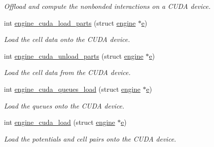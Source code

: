 \begin{DoxyCompactItemize}
\begin{DoxyCompactList}\small\item\em Offload and compute the nonbonded interactions on a C\-U\-D\-A device. \end{DoxyCompactList}\item 
int \hyperlink{runner__cuda_8cu_ab0d9b84f18b2171f13e7b563f3f023f9}{engine\-\_\-cuda\-\_\-load\-\_\-parts} (struct \hyperlink{structengine}{engine} $\ast$\hyperlink{potential__eval_8h_ad93203f13cbfb07bd361e3b37b092fff}{e})
\begin{DoxyCompactList}\small\item\em Load the cell data onto the C\-U\-D\-A device. \end{DoxyCompactList}\item 
int \hyperlink{runner__cuda_8cu_a24fe668d11a9f02087983cacebacc005}{engine\-\_\-cuda\-\_\-unload\-\_\-parts} (struct \hyperlink{structengine}{engine} $\ast$\hyperlink{potential__eval_8h_ad93203f13cbfb07bd361e3b37b092fff}{e})
\begin{DoxyCompactList}\small\item\em Load the cell data from the C\-U\-D\-A device. \end{DoxyCompactList}\item 
int \hyperlink{runner__cuda_8cu_a350f16fa3cd8830b375ea6a35d4f6628}{engine\-\_\-cuda\-\_\-queues\-\_\-load} (struct \hyperlink{structengine}{engine} $\ast$\hyperlink{potential__eval_8h_ad93203f13cbfb07bd361e3b37b092fff}{e})
\begin{DoxyCompactList}\small\item\em Load the queues onto the C\-U\-D\-A device. \end{DoxyCompactList}\item 
int \hyperlink{runner__cuda_8cu_a9c7e994c307502452bdb87b0e60fb9cc}{engine\-\_\-cuda\-\_\-load} (struct \hyperlink{structengine}{engine} $\ast$\hyperlink{potential__eval_8h_ad93203f13cbfb07bd361e3b37b092fff}{e})
\begin{DoxyCompactList}\small\item\em Load the potentials and cell pairs onto the C\-U\-D\-A device. \end{DoxyCompactList}\end{DoxyCompactItemize}
